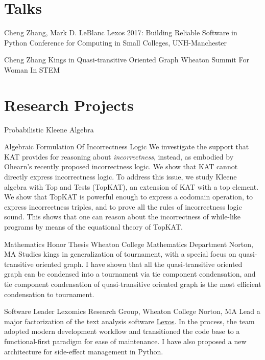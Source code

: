 \documentclass[11pt,a4paper,roman]{moderncv}        %
\begin{document}
\section{Talks}

{Cheng Zhang, Mark D. LeBlanc}
{Lexos 2017: Building Reliable Software in Python}
{Conference for Computing in Small Colleges, UNH-Manchester}
{}{}

{Cheng Zhang}
{Kings in Quasi-transitive Oriented Graph}
{Wheaton Summit For Woman In STEM}
{}{}


\section{Research Projects}

{Probabilistic Kleene Algebra}
{}{}{}{}

{Algebraic Formulation Of Incorrectness Logic}
{}{}{}
{We investigate the support that KAT provides for reasoning about \emph{incorrectness}, 
instead, as embodied by Ohearn's recently proposed incorrectness logic. 
We show that KAT cannot directly express incorrectness logic. 
To address this issue, we study Kleene algebra with Top and Tests (TopKAT), 
an extension of KAT with a top element. 
We show that TopKAT is powerful enough to express a codomain operation, 
to express incorrectness triples, 
and to prove all the rules of incorrectness logic sound. 
This shows that one can reason about the incorrectness of while-like programs 
by means of the equational theory of TopKAT. }

{Mathematics Honor Thesis}
{Wheaton College Mathematics Department}
{Norton, MA}{}
{Studies kings in generalization of tournament,
with a special focus on quasi-transitive oriented graph.
I have shown that all the quasi-transitive oriented graph
can be condensed into a tournament 
via tie component condensation, and tie component condensation
of quasi-transitive oriented graph is the 
most efficient condensation to tournament.
}

{Software Leader}
{Lexomics Research Group, Wheaton College}
{Norton, MA}{}
{
  Lead a major factorization of the text analysis software 
  \href{https://github.com/WheatonCS/Lexos}{Lexos}.
  In the process, the team adopted modern development workflow and
  transitioned the code base to a functional-first paradigm for ease of maintenance.
  I have also proposed a new architecture for side-effect management in Python.
}
\end{document}
